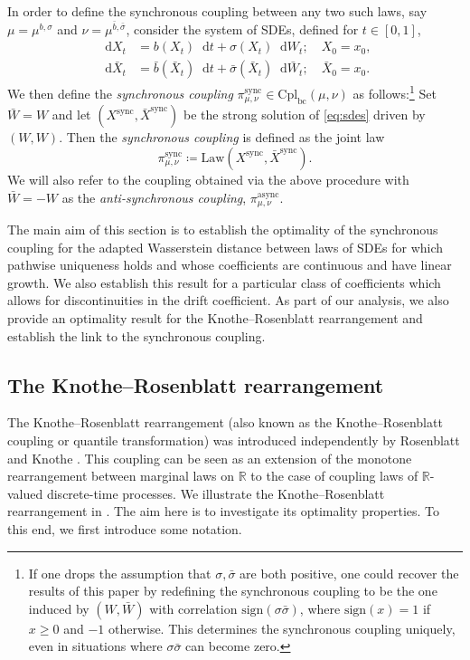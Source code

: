 \documentclass[oneside]{amsart}
\theoremstyle{definition}
\newcommand{\Law}{\mathrm{Law}}
\newcommand{\sign}{\mathrm{sign}}
\newcommand{\R}{\mathbb R}
\newcommand{\cplbc}{\mathrm{Cpl}_{\mathrm{bc}}}
\newcommand{\sync}{\mathrm{sync}}
\newcommand{\async}{\mathrm{async}}
\newcommand{\D}{\mathop{}\!\mathrm{d}}
\def\R{{\mathbb R}}
\numberwithin{equation}{section}
\begin{document}
In order to define the synchronous coupling between any two such laws, say $\mu=\mu^{b,\sigma}$ and $\nu=\mu^{\bar b,\bar\sigma}$, consider the system of SDEs, defined for $t \in [0, 1]$,
\begin{equation}\label{eq:sdes}
	\begin{split}
		\D X_t & = b(X_t)\D t + \sigma(X_t) \D W_t; \quad X_0 = x_0,\\
		\D \bar{X}_t & = \bar{b}(\bar{X}_t)\D t + \bar{\sigma}(\bar{X}_t)\D \bar{W}_t; \quad \bar{X}_0 = x_0.
	\end{split}
\end{equation}
We then define the \emph{synchronous coupling} $\pi^\sync_{\mu, \nu} \in \cplbc(\mu, \nu)$ as follows:\footnote{If one drops the assumption that $\sigma, \bar \sigma$ are both positive, one could recover the results of this paper by redefining the synchronous coupling to be the one induced by $(W, \bar W)$ with correlation $\sign(\sigma \bar \sigma)$, where $\sign(x)=1$ if $x\geq 0$ and $-1$ otherwise. This determines the synchronous coupling uniquely, even in situations where $\sigma\bar\sigma$ can become zero.} Set $\bar{W} = W$ and let $(X^\sync, \bar{X}^\sync)$ be the strong solution of \eqref{eq:sdes} driven by $(W, W)$. Then the \emph{synchronous coupling} is defined as the joint law
\begin{equation}
    \pi^\sync_{\mu, \nu}\coloneqq  \Law(X^\sync, \bar{X}^\sync).
\end{equation}
We will also refer to the coupling obtained via the above procedure with $\bar W=-W$ as the \emph{anti-synchronous coupling}, $\pi^{\async}_{\mu,\nu}$. 

The main aim of this section is to establish the optimality of the synchronous coupling for the adapted Wasserstein distance between laws of SDEs for which pathwise uniqueness holds and whose coefficients are continuous and have linear growth. 
We also establish this result for a particular class of coefficients which allows for discontinuities in the drift coefficient.
As part of our analysis, we also provide an optimality result for the Knothe--Rosenblatt rearrangement and establish the link to the synchronous coupling. 

\subsection{The Knothe--Rosenblatt rearrangement}\label{sec:kr}


The Knothe--Rosenblatt rearrangement (also known as the Knothe--Rosenblatt coupling or quantile transformation) was introduced independently by Rosenblatt \cite{Ro52} and Knothe \cite{Kn57}. This coupling can be seen as an extension of the monotone rearrangement between marginal laws on $\R$ to the case of coupling laws of $\R$-valued discrete-time processes. We illustrate the Knothe--Rosenblatt rearrangement in . The aim here is to investigate its optimality properties. To this end, we first introduce some notation.
\end{document}
